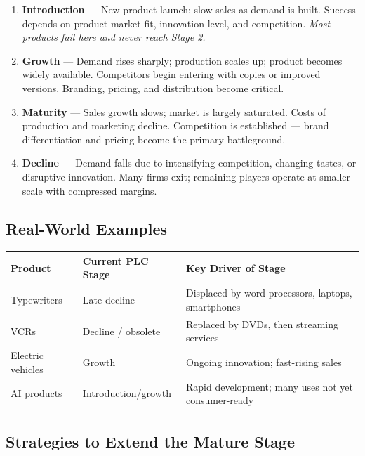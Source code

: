 \documentclass[11pt, letterpaper]{article}
\begin{document}
\begin{enumerate}[leftmargin=*, label=\textbf{Stage \arabic{enumi}.}]
  \item \textbf{Introduction} --- New product launch; slow sales as demand is built. Success depends on product-market fit, innovation level, and competition. \textit{Most products fail here and never reach Stage 2.}
  \item \textbf{Growth} --- Demand rises sharply; production scales up; product becomes widely available. Competitors begin entering with copies or improved versions. Branding, pricing, and distribution become critical.
  \item \textbf{Maturity} --- Sales growth slows; market is largely saturated. Costs of production and marketing decline. Competition is established --- brand differentiation and pricing become the primary battleground.
  \item \textbf{Decline} --- Demand falls due to intensifying competition, changing tastes, or disruptive innovation. Many firms exit; remaining players operate at smaller scale with compressed margins.
\end{enumerate}

\subsection{Real-World Examples}

\begin{center}
\begin{tabular}{lll}
\toprule
\textbf{Product} & \textbf{Current PLC Stage} & \textbf{Key Driver of Stage} \\
\midrule
Typewriters & Late decline & Displaced by word processors, laptops, smartphones \\
VCRs & Decline / obsolete & Replaced by DVDs, then streaming services \\
Electric vehicles & Growth & Ongoing innovation; fast-rising sales \\
AI products & Introduction/growth & Rapid development; many uses not yet consumer-ready \\
\bottomrule
\end{tabular}
\end{center}

\subsection{Strategies to Extend the Mature Stage}
\end{document}
